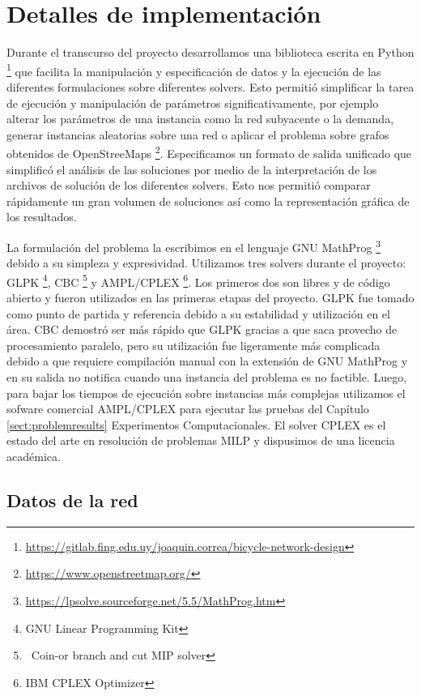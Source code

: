 \chapter{Detalles de implementación}

Durante el transcurso del proyecto desarrollamos una biblioteca escrita en Python \footnote{\url{https://gitlab.fing.edu.uy/joaquin.correa/bicycle-network-design}} que facilita la manipulación y especificación de datos y la ejecución de las diferentes formulaciones sobre diferentes solvers. Esto permitió simplificar la tarea de ejecución y manipulación de parámetros significativamente, por ejemplo alterar los parámetros de una instancia como la red subyacente o la demanda, generar instancias aleatorias sobre una red o aplicar el problema sobre grafos obtenidos de OpenStreeMaps \footnote{\url{https://www.openstreetmap.org/}}. Especificamos un formato de salida unificado que simplificó el análisis de las soluciones por medio de la interpretación de los archivos de solución de los diferentes solvers. Esto nos permitió comparar rápidamente un gran volumen de soluciones así como la representación gráfica de los resultados.

La formulación del problema la escribimos en el lenguaje GNU MathProg \footnote{\url{https://lpsolve.sourceforge.net/5.5/MathProg.htm}} debido a su simpleza y expresividad. Utilizamos tres solvers durante el proyecto: GLPK \footnote{GNU Linear Programming Kit}, CBC \footnote{\ Coin-or branch and cut MIP solver} y AMPL/CPLEX \footnote{IBM CPLEX Optimizer}. Los primeros dos son libres y de código abierto y fueron utilizados en las primeras etapas del proyecto. GLPK fue tomado como punto de partida y referencia debido a su estabilidad y utilización en el área. CBC demostró ser más rápido que GLPK gracias a que saca provecho de procesamiento paralelo, pero su utilización fue ligeramente más complicada debido a que requiere compilación manual con la extensión de GNU MathProg y en su salida no notifica cuando una instancia del problema es no factible. Luego, para bajar los tiempos de ejecución sobre instancias más complejas utilizamos el sofware comercial AMPL/CPLEX para ejecutar las pruebas del Capítulo \ref{sect:problemresults} Experimentos Computacionales. El solver CPLEX es el estado del arte en resolución de problemas MILP y dispusimos de una licencia académica.

\section*{Datos de la red}
\label{sect:costcalculation}

